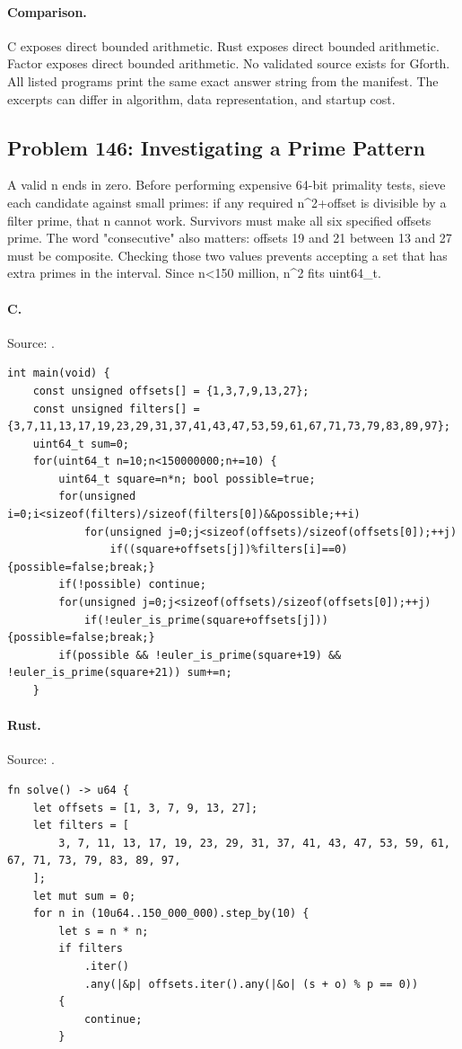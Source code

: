 \paragraph{Comparison.}
C exposes direct bounded arithmetic. Rust exposes direct bounded arithmetic. Factor exposes direct bounded arithmetic.
No validated source exists for Gforth.
All listed programs print the same exact answer string from the manifest. The excerpts can differ in algorithm, data representation, and startup cost.

\subsection{Problem 146: Investigating a Prime Pattern}
\label{walkthrough:p146}
A valid n ends in zero. Before performing expensive 64-bit primality tests, sieve each candidate against small primes: if any required n\textasciicircum{}2+offset is divisible by a filter prime, that n cannot work. Survivors must make all six specified offsets prime. The word "consecutive" also matters: offsets 19 and 21 between 13 and 27 must be composite. Checking those two values prevents accepting a set that has extra primes in the interval. Since n<150 million, n\textasciicircum{}2 fits uint64\_t.

\paragraph{C.} Source: .
\begin{lstlisting}
int main(void) {
    const unsigned offsets[] = {1,3,7,9,13,27};
    const unsigned filters[] = {3,7,11,13,17,19,23,29,31,37,41,43,47,53,59,61,67,71,73,79,83,89,97};
    uint64_t sum=0;
    for(uint64_t n=10;n<150000000;n+=10) {
        uint64_t square=n*n; bool possible=true;
        for(unsigned i=0;i<sizeof(filters)/sizeof(filters[0])&&possible;++i)
            for(unsigned j=0;j<sizeof(offsets)/sizeof(offsets[0]);++j)
                if((square+offsets[j])%filters[i]==0){possible=false;break;}
        if(!possible) continue;
        for(unsigned j=0;j<sizeof(offsets)/sizeof(offsets[0]);++j)
            if(!euler_is_prime(square+offsets[j])){possible=false;break;}
        if(possible && !euler_is_prime(square+19) && !euler_is_prime(square+21)) sum+=n;
    }
\end{lstlisting}

\paragraph{Rust.} Source: .
\begin{lstlisting}
fn solve() -> u64 {
    let offsets = [1, 3, 7, 9, 13, 27];
    let filters = [
        3, 7, 11, 13, 17, 19, 23, 29, 31, 37, 41, 43, 47, 53, 59, 61, 67, 71, 73, 79, 83, 89, 97,
    ];
    let mut sum = 0;
    for n in (10u64..150_000_000).step_by(10) {
        let s = n * n;
        if filters
            .iter()
            .any(|&p| offsets.iter().any(|&o| (s + o) % p == 0))
        {
            continue;
        }
\end{lstlisting}

